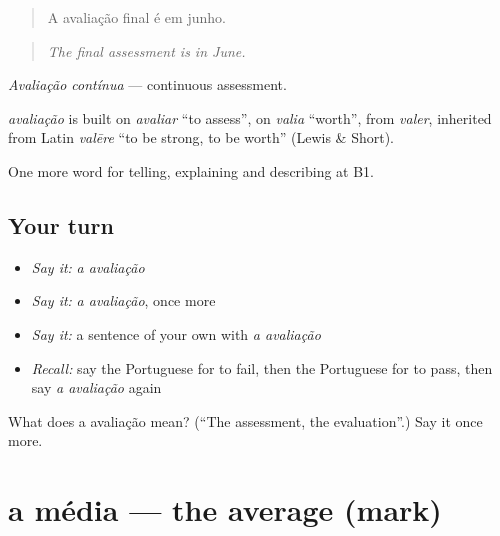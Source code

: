 \begin{quote}
A avaliação final é em junho.
\end{quote}

\begin{quote}
\emph{The final assessment is in June.}
\end{quote}

\emph{Avaliação contínua} — continuous assessment.

\begin{cousinweb}
\emph{avaliação} is built on \emph{avaliar} \textquotedblleft{}to assess\textquotedblright{}, on \emph{valia} \textquotedblleft{}worth\textquotedblright{}, from \emph{valer}, inherited from Latin \emph{valēre} \textquotedblleft{}to be strong, to be worth\textquotedblright{} (Lewis \& Short).
\end{cousinweb}

\begin{grammarlens}[title={What you've built}]
One more word for telling, explaining and describing at B1.
\end{grammarlens}

\subsection*{Your turn}
\begin{itemize}
\raggedright
  \item \emph{Say it:} \emph{a avaliação}
  \item \emph{Say it:} \emph{a avaliação}, once more
  \item \emph{Say it:} a sentence of your own with \emph{a avaliação}
  \item \emph{Recall:} say the Portuguese for to fail, then the Portuguese for to pass, then say \emph{a avaliação} again
\end{itemize}

\begin{tcolorbox}[breakable,colback=teal!4,colframe=teal!35!black,title={Before you move on}]
What does a avaliação mean? (\textquotedblleft{}The assessment, the evaluation\textquotedblright{}.) Say it once more.
\end{tcolorbox}
\section[a média]{a média — the average (mark)}

\label{lesson:PT-C379-media}



